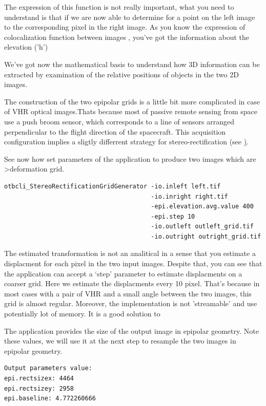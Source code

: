 The expression of this function is not really important, what you need to understand is that if we are now able to determine for a point on the left image to the corresponding pixel in the right image. As you know the expression of colocalization function between images , you've got the information about the elevation ('h')

We've got now the mathematical basis to understand how 3D information can be extracted by examination of the relative positions of objects in the two 2D images.

The construction of the two epipolar grids is a little bit more complicated in case of VHR optical images.Thats because most of passive remote sensing from space use a push broom sensor, which corresponds to a line of sensors arranged perpendicular to the flight direction of the spacecraft. This acquisition configuration implies a sligtly differrent strategy for stereo-rectification  (see \href{http://en.wikipedia.org/wiki/Epipolar_geometry#Epipolar_geometry_of_pushbroom_sensor}).

See now how set parameters of the application to  produce two images which are \textgreater{deformation grid}.
\begin{verbatim}
otbcli_StereoRectificationGridGenerator -io.inleft left.tif
                                        -io.inright right.tif
                                        -epi.elevation.avg.value 400
                                        -epi.step 10
                                        -io.outleft outleft_grid.tif
                                        -io.outright outright_grid.tif
\end{verbatim}

The estimated transformation is not an analitical in a sense that you estimate a displacment for each pixel in the two input images. Despite that, you can see that the application can accept a `step' parameter to estimate displacments on a coarser grid. Here we estimate the displacments every 10 pixel.
That's because in most cases with a pair of VHR and a small angle between the two images, this grid is almost regular. Moreover, the implementation is not 'streamable' and use potentially lot of memory. It is a good solution to

The application provides the size of the output image in epipolar geometry. Note these values, we will use it at the next step to resample the two images in epipolar geometry.

\begin{verbatim}
Output parameters value:
epi.rectsizex: 4464
epi.rectsizey: 2958
epi.baseline: 4.772260666
\end{verbatim}

